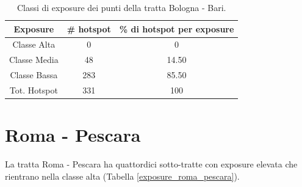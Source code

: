\begin{table}[H]
	\centering
	\begin{tabular}{|c|c|c|}
		\hline
		\rowcolor[HTML]{C0C0C0} 
		\textbf{Exposure} & \textbf{\# hotspot} & \textbf{\% di hotspot per exposure} \\ \hline
		Classe Alta       & 0                   & 0                                   \\ \hline
		Classe Media      & 48                 & 14.50                               \\ \hline
		Classe Bassa      & 283                 & 85.50                              \\ \hline
		Tot. Hotspot      & 331                 & 100                                 \\ \hline
	\end{tabular}
\caption{Classi di exposure dei punti della tratta Bologna - Bari.}
\label{risultati_sotto_tratte_bologna_bari}

\end{table}

\section{Roma - Pescara}
La tratta Roma - Pescara ha quattordici sotto-tratte con exposure elevata che rientrano nella classe alta (Tabella \ref{exposure_roma_pescara}).

